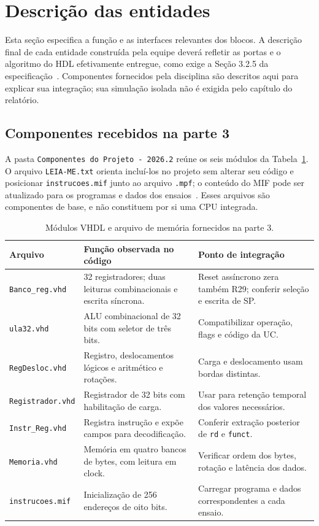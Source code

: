 \section{Descrição das entidades}\label{sec:entidades}

Esta seção especifica a função e as interfaces relevantes dos blocos. A descrição final de cada entidade construída pela equipe deverá refletir as portas e o algoritmo do HDL efetivamente entregue, como exige a Seção 3.2.5 da especificação~\cite{especificacao}. Componentes fornecidos pela disciplina são descritos aqui para explicar sua integração; sua simulação isolada não é exigida pelo capítulo do relatório.

\subsection{Componentes recebidos na parte 3}\label{subsec:componentes-pt3}

A pasta \texttt{Componentes do Projeto - 2026.2} reúne os seis módulos da Tabela~\ref{tab:modulos-pt3}. O arquivo \texttt{LEIA-ME.txt} orienta incluí-los no projeto sem alterar seu código e posicionar \texttt{instrucoes.mif} junto ao arquivo \texttt{.mpf}; o conteúdo do MIF pode ser atualizado para os programas e dados dos ensaios~\cite{docpt3}. Esses arquivos são componentes de base, e não constituem por si uma CPU integrada.

\begin{table}[H]\centering\small
\caption{Módulos VHDL e arquivo de memória fornecidos na parte 3.}\label{tab:modulos-pt3}
\begin{tabularx}{\linewidth}{@{}p{3.4cm}X X@{}}\toprule
Arquivo & Função observada no código & Ponto de integração \\\midrule
\texttt{Banco\_reg.vhd} & 32 registradores; duas leituras combinacionais e escrita síncrona. & Reset assíncrono zera também R29; conferir seleção e escrita de SP. \\
\texttt{ula32.vhd} & ALU combinacional de 32 bits com seletor de três bits. & Compatibilizar operação, flags e código da UC. \\
\texttt{RegDesloc.vhd} & Registro, deslocamentos lógicos e aritmético e rotações. & Carga e deslocamento usam bordas distintas. \\
\texttt{Registrador.vhd} & Registrador de 32 bits com habilitação de carga. & Usar para retenção temporal dos valores necessários. \\
\texttt{Instr\_Reg.vhd} & Registra instrução e expõe campos para decodificação. & Conferir extração posterior de \texttt{rd} e \texttt{funct}. \\
\texttt{Memoria.vhd} & Memória em quatro bancos de bytes, com leitura em clock. & Verificar ordem dos bytes, rotação e latência dos dados. \\
\texttt{instrucoes.mif} & Inicialização de 256 endereços de oito bits. & Carregar programa e dados correspondentes a cada ensaio. \\\bottomrule
\end{tabularx}
\end{table}

